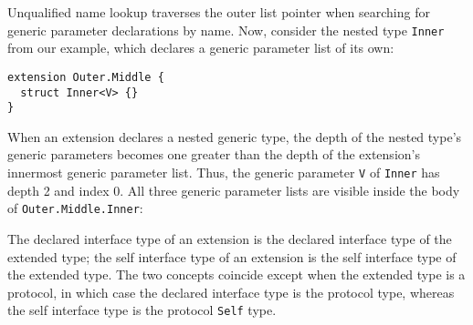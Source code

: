 \documentclass[../generics]{subfiles}
\begin{document}
Unqualified name lookup traverses the outer list pointer when searching for generic parameter declarations by name. Now, consider the nested type \texttt{Inner} from our example, which declares a generic parameter list of its own:
\begin{Verbatim}
extension Outer.Middle {
  struct Inner<V> {}
}
\end{Verbatim}
When an extension declares a nested generic type, the depth of the nested type's generic parameters becomes one greater than the depth of the extension's innermost generic parameter list. Thus, the generic parameter \texttt{V} of \texttt{Inner} has depth 2 and index 0. All three generic parameter lists are visible inside the body of \texttt{Outer.Middle.Inner}:
\begin{quote}
\end{quote}
The declared interface type of an extension is the declared interface type of the extended type; the self interface type of an extension is the self interface type of the extended type. The two concepts coincide except when the extended type is a protocol, in which case the declared interface type is the protocol type, whereas the self interface type is the protocol \texttt{Self} type.
\end{document}
